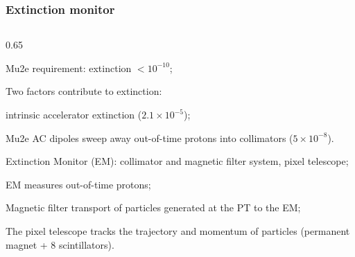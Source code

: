 \documentclass{beamer}
\begin{document}
\begin{frame}
    \frametitle{Extinction monitor}
    \vspace{-3mm}
    \begin{columns}
        \begin{column}{0.65\framewidth}
            \setlength{\leftmargini}{1.1em}
           
               \begin{itemize}
              {\small  
\item Mu2e requirement: extinction $<10^{-10}$;
\vspace{2mm}
\item Two factors contribute to extinction: }
\vspace{1mm}
\begin{itemize}
    {\small 
\item intrinsic accelerator
extinction ($2.1 \times 10^{-5}$);
\vspace{1mm}
\item Mu2e AC dipoles sweep away out-of-time protons into
collimators ($5\times 10^{-8}$).}
\vspace{2mm}
\end{itemize}
{\small 
\item Extinction Monitor (EM): collimator and magnetic filter 
system, pixel telescope; 
\vspace{2mm}
\item EM measures out-of-time protons;
\vspace{2mm}
\item Magnetic filter transport of particles generated at the PT to the EM;
\vspace{2mm}
\item The pixel telescope tracks the trajectory and momentum of particles (permanent magnet + 8 scintillators).}


\end{itemize}
\end{column}
\end{columns}
\end{frame}
\end{document}
